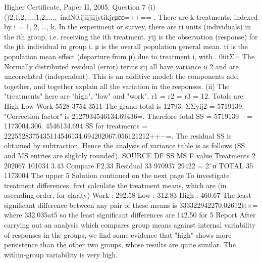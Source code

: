 Higher Certificate, Paper II, 2005. Question 7
(i) {}()2,1,2,...,,1,2,...,,~indN0,ijiijiijytikjrμεε=++== .
There are k treatments, indexed by i = 1, 2, …, k. In the experiment or survey, there are ri units (individuals) in the ith group, i.e. receiving the ith treatment. yij is the observation (response) for the jth individual in group i.
μ is the overall population general mean. ti is the population mean effect (departure from μ) due to treatment i, with . 0iitΣ=
The Normally distributed residual (error) terms εij all have variance σ 2 and are uncorrelated (independent).
This is an additive model: the components add together, and together explain all the variation in the responses.
(ii) The "treatments" here are "high", "low" and "work". r1 = r2 = r3 = 12.
Totals are:
High
Low
Work
5528
3754
3511
The grand total is 12793. ΣΣyij2 = 5719139.
"Correction factor" is 2127934546134.69436=.
Therefore total SS = 5719139 – = 1173004.306. 4546134.694
SS for treatments = 2225528375435114546134.694202067.056121212++−=.
The residual SS is obtained by subtraction.
Hence the analysis of variance table is as follows (SS and MS entries are slightly rounded).
SOURCE
DF
SS
MS
F value
Treatments
2
202067
101034
3.43 Compare F2,33
Residual
33
970937
29422
= 2ˆσ
TOTAL
35
1173004
The upper 5%
Solution continued on the next page
To investigate treatment differences, first calculate the treatment means, which are (in ascending order, for clarity)
Work : 292.58 Low : 312.83 High : 460.67
The least significant difference between any pair of these means is
333322942270.02612tt×= where 332.035at5%
so the least significant differences are 142.50 for 5%
Report
After carrying out an analysis which compares group means against internal variability of responses in the groups, we find some evidence that "high" shows more persistence than the other two groups, whose results are quite similar. The within-group variability is very high.
